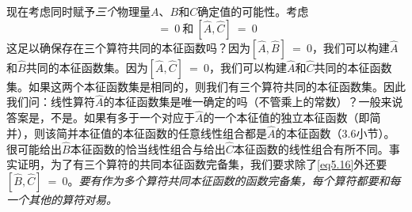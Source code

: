 \documentclass[12pt,a4paper,openany]{ctexbook}
\begin{document}
\begin{flushleft}
现在考虑同时赋予\textit{三个}物理量$A$、$B$和$C$确定值的可能性。考虑
\begin{equation}
    [\hat{A},\hat{B}]\ =\ 0\ \text{和}\  [\hat{A},\hat{C}]\ =\ 0 \label{eq5.16}
\end{equation}
这足以确保存在三个算符共同的本征函数吗？因为$[\hat{A},\hat{B}]\ =\ 0$，我们可以构建$\hat{A}$和$\hat{B}$共同的本征函数集。因为$[\hat{A},\hat{C}]\ =\ 0$，我们可以构建$\hat{A}$和$\hat{C}$共同的本征函数集。如果这两个本征函数集是相同的，则我们有三个算符共同的本征函数集。因此我们问：线性算符$\hat{A}$的本征函数集是唯一确定的吗（不管乘上的常数）？一般来说答案是，不是。如果有多于一个对应于$\hat{A}$的一个本征值的独立本征函数（即简并），则该简并本征值的本征函数的任意线性组合都是$\hat{A}$的本征函数（3.6小节）。很可能给出$\hat{B}$本征函数的恰当线性组合与给出$\hat{C}$本征函数的线性组合有所不同。事实证明，为了有三个算符的共同本征函数完备集，我们要求除了\eqref{eq5.16}外还要$[\hat{B},\hat{C}]\ =\ 0$。\textit{要有作为多个算符共同本征函数的函数完备集，每个算符都要和每一个其他的算符对易。}
\end{flushleft}
\end{document}
